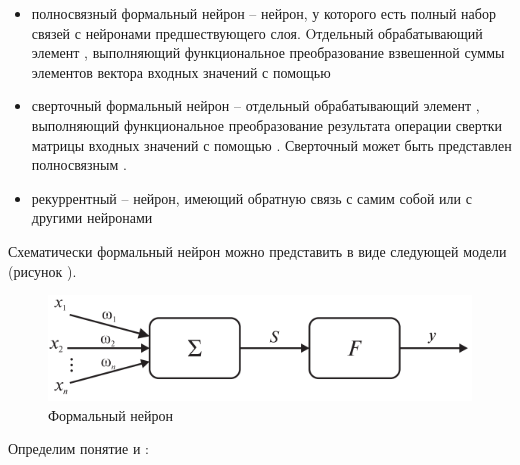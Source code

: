 \begin{itemize}
		\item полносвязный формальный нейрон -- нейрон, у которого есть полный набор связей с нейронами предшествующего слоя. Oтдельный обрабатывающий элемент , выполняющий функциональное преобразование взвешенной суммы элементов вектора входных значений с помощью 
	 \item сверточный формальный нейрон -- отдельный обрабатывающий элемент , выполняющий функциональное преобразование результата операции свертки матрицы входных значений с помощью . Сверточный  может быть представлен полносвязным .
	\item рекуррентный  -- нейрон, имеющий обратную связь с самим собой или с другими нейронами 
\end{itemize}

Схематически формальный нейрон можно представить в виде следующей модели (рисунок \textit{}).

\begin{figure}[H]
	\includegraphics[scale=0.8]{author/part3/figures/formal_neuron.png}
	\caption{Формальный нейрон}
	\label{fig:formal_neuron}
\end{figure}

Определим понятие  и :

\begin{SCn}
\end{SCn}


\begin{SCn}
\end{SCn}

